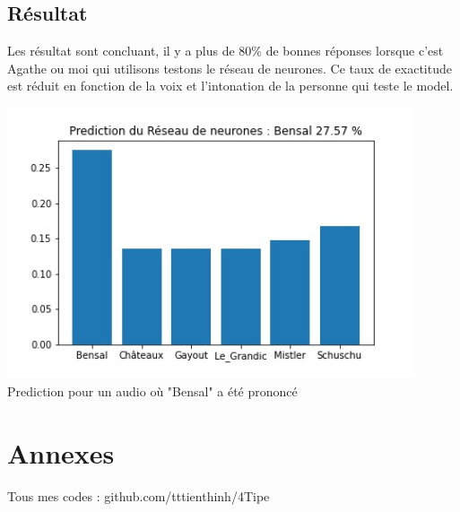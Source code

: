 \documentclass[12pt,a4paper, french]{article}
\begin{document}
\subsection{Résultat}
Les résultat sont concluant, il y a plus de 80\% de bonnes réponses lorsque c'est Agathe ou moi qui utilisons testons le réseau de neurones. Ce taux de exactitude est réduit en fonction de la voix et l'intonation de la personne qui teste le model. 

\begin{center}
    \includegraphics[width=12cm]{4-Resultat Bensal.jpg} \\
    Prediction pour un audio où "Bensal" a été prononcé
\end{center}

\section*{Annexes}
Tous mes codes : github.com/tttienthinh/4Tipe
\end{document}
